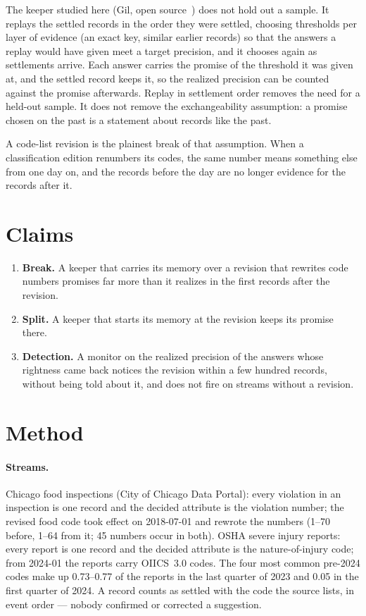 \documentclass[11pt]{article}
\begin{document}
The keeper studied here (Gil, open source~\cite{gil}) does not hold out a sample. It replays the settled records in the
order they were settled, choosing thresholds per layer of evidence (an exact key, similar earlier records) so that the
answers a replay would have given meet a target precision, and it chooses again as settlements arrive. Each answer
carries the promise of the threshold it was given at, and the settled record keeps it, so the realized precision can be
counted against the promise afterwards. Replay in settlement order removes the need for a held-out sample. It does not
remove the exchangeability assumption: a promise chosen on the past is a statement about records like the past.

A code-list revision is the plainest break of that assumption. When a classification edition renumbers its codes, the
same number means something else from one day on, and the records before the day are no longer evidence for the records
after it.

\section{Claims}

\begin{enumerate}
  \item \textbf{Break.} A keeper that carries its memory over a revision that rewrites code numbers promises far more
  than it realizes in the first records after the revision.
  \item \textbf{Split.} A keeper that starts its memory at the revision keeps its promise there.
  \item \textbf{Detection.} A monitor on the realized precision of the answers whose rightness came back notices the
  revision within a few hundred records, without being told about it, and does not fire on streams without a revision.
\end{enumerate}

\section{Method}

\paragraph{Streams.} Chicago food inspections (City of Chicago Data Portal): every violation in an inspection is one
record and the decided attribute is the violation number; the revised food code took effect on 2018-07-01 and rewrote
the numbers (1--70 before, 1--64 from it; 45 numbers occur in both). OSHA severe injury reports: every report is one
record and the decided attribute is the nature-of-injury code; from 2024-01 the reports carry OIICS~3.0 codes. The four
most common pre-2024 codes make up 0.73--0.77 of the reports in the last quarter of 2023 and 0.05 in the first quarter
of 2024. A record counts as settled with the code the source lists, in event order --- nobody confirmed or corrected a
suggestion.
\end{document}

